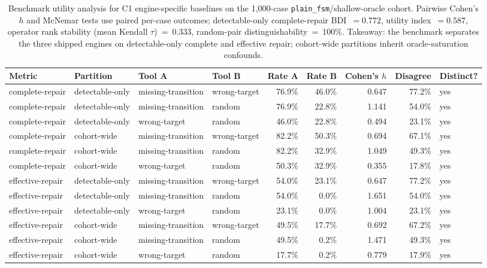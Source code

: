 \begin{table}[t]
\caption{Benchmark utility analysis for C1 engine-specific baselines on the 1{,}000-case \texttt{plain\_fsm}/shallow-oracle cohort. Pairwise Cohen's $h$ and McNemar tests use paired per-case outcomes; detectable-only complete-repair BDI~$=0.772$, utility index~$=0.587$, operator rank stability (mean Kendall $\tau$)~=~0.333, random-pair distinguishability~=~100\%. Takeaway: the benchmark separates the three shipped engines on detectable-only complete and effective repair; cohort-wide partitions inherit oracle-saturation confounds.}
\label{tab:benchmark-utility}
\begin{tabular}{@{}llllrrrrl@{}}
\toprule
Metric & Partition & Tool A & Tool B & Rate A & Rate B & Cohen's $h$ & Disagree & Distinct? \\
\midrule
complete-repair & detectable-only & missing-transition & wrong-target & 76.9\% & 46.0\% & 0.647 & 77.2\% & yes \\
complete-repair & detectable-only & missing-transition & random & 76.9\% & 22.8\% & 1.141 & 54.0\% & yes \\
complete-repair & detectable-only & wrong-target & random & 46.0\% & 22.8\% & 0.494 & 23.1\% & yes \\
complete-repair & cohort-wide & missing-transition & wrong-target & 82.2\% & 50.3\% & 0.694 & 67.1\% & yes \\
complete-repair & cohort-wide & missing-transition & random & 82.2\% & 32.9\% & 1.049 & 49.3\% & yes \\
complete-repair & cohort-wide & wrong-target & random & 50.3\% & 32.9\% & 0.355 & 17.8\% & yes \\
effective-repair & detectable-only & missing-transition & wrong-target & 54.0\% & 23.1\% & 0.647 & 77.2\% & yes \\
effective-repair & detectable-only & missing-transition & random & 54.0\% & 0.0\% & 1.651 & 54.0\% & yes \\
effective-repair & detectable-only & wrong-target & random & 23.1\% & 0.0\% & 1.004 & 23.1\% & yes \\
effective-repair & cohort-wide & missing-transition & wrong-target & 49.5\% & 17.7\% & 0.692 & 67.2\% & yes \\
effective-repair & cohort-wide & missing-transition & random & 49.5\% & 0.2\% & 1.471 & 49.3\% & yes \\
effective-repair & cohort-wide & wrong-target & random & 17.7\% & 0.2\% & 0.779 & 17.9\% & yes \\
\bottomrule
\end{tabular}
\end{table}
